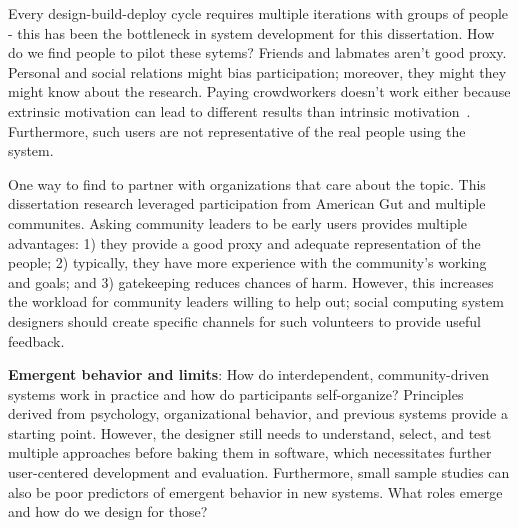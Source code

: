 

Every design-build-deploy cycle requires multiple iterations with groups of people - this has been the bottleneck in system development for this dissertation. How do we find people to pilot these sytems? Friends and labmates aren't good proxy. Personal and social relations might bias participation; moreover, they might they might know about the research. Paying crowdworkers doesn't work either because extrinsic motivation can lead to different results than intrinsic motivation~\cite{Chandler2013}. Furthermore, such users are not representative of the real people using the system.

One way to find to partner with organizations that care about the topic. This dissertation research leveraged participation from American Gut and multiple communites. Asking community leaders to be early users provides multiple advantages: 1) they provide a good proxy and adequate representation of the people; 2) typically, they have more experience with the community's working and goals; and 3) gatekeeping reduces chances of harm. However, this increases the workload for community leaders willing to help out; social computing system designers should create specific channels for such volunteers to provide useful feedback.



\textbf{Emergent behavior and limits}: How do interdependent, community-driven systems work in practice and how do participants self-organize? Principles derived from psychology, organizational behavior, and previous systems provide a starting point. However, the designer still needs to understand, select, and test multiple approaches before baking them in software, which necessitates further user-centered development and evaluation. Furthermore, small sample studies can also be poor predictors of emergent behavior in new systems. What roles emerge and how do we design for those?

